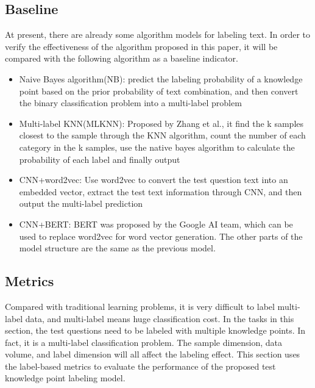 \subsection{Baseline}
At present, there are already some algorithm models for labeling text. In order to verify the effectiveness of the algorithm proposed in this paper, it will be compared with the following algorithm as a baseline indicator.
\begin{itemize}
	\item Naive Bayes algorithm(NB): predict the labeling probability of a knowledge point based on the prior probability of text combination, and then convert the binary classification problem into a multi-label problem
	\item Multi-label KNN(MLKNN): Proposed by Zhang et al.\cite{zhang2007ml}, it find the k samples closest to the sample through the KNN algorithm, count the number of each category in the k samples, use the native bayes algorithm to calculate the probability of each label and finally output
	\item CNN+word2vec: Use word2vec to convert the test question text into an embedded vector, extract the test text information through CNN, and then output the multi-label prediction
	\item CNN+BERT: BERT was proposed by the Google AI team\cite{devlin2019bert}, which can be used to replace word2vec for word vector generation. The other parts of the model structure are the same as the previous model.
\end{itemize}

\subsection{Metrics}
Compared with traditional learning problems, it is very difficult to label multi-label data, and multi-label means huge classification cost\cite{zhang2013review}. In the tasks in this section, the test questions need to be labeled with multiple knowledge points. In fact, it is a multi-label classification problem. The sample dimension, data volume, and label dimension will all affect the labeling effect. This section uses the label-based metrics to evaluate the performance of the proposed test knowledge point labeling model.

